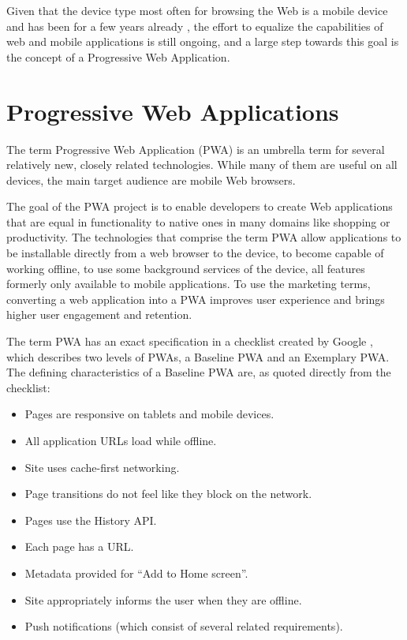 \documentclass[english,zadani,odsaz]{fitthesis}
\begin{document}
Given that the device type most often for browsing the Web is a mobile device
and has been for a few years already \cite{mobile-stats}, the effort to equalize
the capabilities of web and mobile applications is still ongoing, and a large
step towards this goal is the concept of a Progressive Web Application.

\section{Progressive Web Applications}
\label{sec:org9cbfaa7}
The term Progressive Web Application (PWA) is an umbrella term for several
relatively new, closely related technologies. While many of them are useful on
all devices, the main target audience are mobile Web browsers.

The goal of the PWA project is to enable developers to create Web applications
that are equal in functionality to native ones in many domains like shopping or
productivity. The technologies that comprise the term PWA allow applications to
be installable directly from a web browser to the device, to become capable of
working offline, to use some background services of the device, all features
formerly only available to mobile applications. To use the marketing terms,
converting a web application into a PWA improves user experience and brings
higher user engagement and retention.

The term PWA has an exact specification in a checklist created by Google
\cite{pwa_checklist}, which describes two levels of PWAs, a Baseline PWA and an
Exemplary PWA. The defining characteristics of a Baseline PWA are, as quoted
directly from the checklist:

\begin{itemize}
\item Pages are responsive on tablets and mobile devices.
\item All application URLs load while offline.
\item Site uses cache-first networking.
\item Page transitions do not feel like they block on the network.
\item Pages use the History API.
\item Each page has a URL.
\item Metadata provided for ``Add to Home screen''.
\item Site appropriately informs the user when they are offline.
\item Push notifications (which consist of several related requirements).
\end{itemize}
\end{document}
